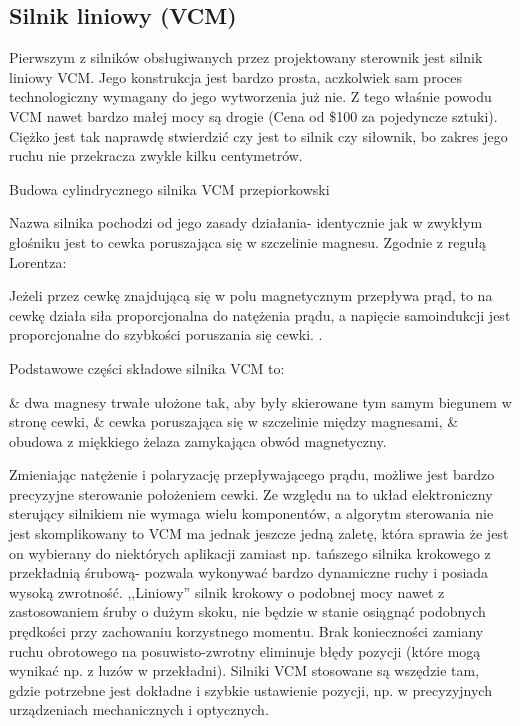 \subsection{Silnik liniowy (VCM)}

Pierwszym z silników obsługiwanych przez projektowany sterownik jest silnik liniowy VCM. Jego konstrukcja jest bardzo prosta, aczkolwiek sam proces technologiczny wymagany do jego wytworzenia już nie. Z tego właśnie powodu VCM nawet bardzo małej mocy są drogie (Cena od \$100 za pojedyncze sztuki). Ciężko jest tak naprawdę stwierdzić czy jest to silnik czy siłownik, bo zakres jego ruchu nie przekracza zwykle kilku centymetrów.

	{Budowa cylindrycznego silnika VCM}
	{przepiorkowski}

Nazwa silnika pochodzi od jego zasady działania- identycznie jak w zwykłym głośniku jest to cewka poruszająca się w szczelinie magnesu. Zgodnie z regułą Lorentza:

\begin{defn}
	Jeżeli przez cewkę znajdującą się w polu magnetycznym przepływa prąd, to na cewkę działa siła proporcjonalna do natężenia prądu, a napięcie samoindukcji jest proporcjonalne do szybkości poruszania się cewki. \cite{przepiorkowski}.
\end{defn}

Podstawowe części składowe silnika VCM to:
\begin{easylist}
	& dwa magnesy trwałe ułożone tak, aby były skierowane tym samym biegunem w stronę cewki,
	& cewka poruszająca się w szczelinie między magnesami,
	& obudowa z miękkiego żelaza zamykająca obwód magnetyczny.
	\\
\end{easylist}

Zmieniając natężenie i polaryzację przepływającego prądu, możliwe jest bardzo precyzyjne sterowanie położeniem cewki. Ze względu na to układ elektroniczny sterujący silnikiem nie wymaga wielu komponentów, a algorytm sterowania nie jest skomplikowany to VCM ma jednak jeszcze jedną zaletę, która sprawia że jest on wybierany do niektórych aplikacji zamiast np. tańszego silnika krokowego z przekładnią śrubową- pozwala wykonywać bardzo dynamiczne ruchy i posiada wysoką zwrotność. ,,Liniowy'' silnik krokowy o podobnej mocy nawet z zastosowaniem śruby o dużym skoku, nie będzie w stanie osiągnąć podobnych prędkości przy zachowaniu korzystnego momentu. Brak konieczności zamiany ruchu obrotowego na posuwisto-zwrotny eliminuje błędy pozycji (które mogą wynikać np. z luzów w przekładni). Silniki VCM stosowane są wszędzie tam, gdzie potrzebne jest dokładne i szybkie ustawienie pozycji, np. w precyzyjnych urządzeniach mechanicznych i optycznych. \\

